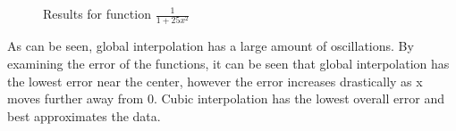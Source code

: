 \documentclass[aps,prb,groupedaddress,nofootinbib,floatfix]{revtex4}
\begin{document}
\begin{figure}
	\centering
	\qquad
	\caption{Results for function $\frac{1}{1+25x^{2}}$}
	\label{fig:fig2}
\end{figure}

As can be seen, global interpolation has a large amount of oscillations. By examining the error of the functions, it can be seen that global interpolation has the lowest error near the center, however the error increases drastically as x moves further away from 0. Cubic interpolation has the lowest overall error and best approximates the data.
\end{document}

